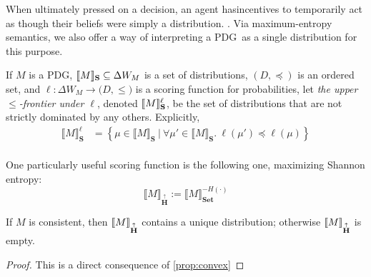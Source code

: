 \documentclass{article}
\newcommand\changed[1]{{\color{note-fg} #1}}
\newcommand\Set{\textbf{Set}}
\newcommand\MaxEnt{{\overset{\uparrow}{\mathbf H}}}
\newcommand{\MN}{PDG}
\begin{document}
	
	\changed{When ultimately pressed on a decision, an agent hasincentives to temporarily act as though their beliefs were simply a distribution. }. Via maximum-entropy semantics, we also offer a way of interpreting a \MN\ as a single distribution for this purpose. 
	
	\begin{defn}
		If  $M$ is a \MN, $\llbracket M\rrbracket_{\mathbf S} \subseteq \Delta W_{M}$ is a set of distributions, $(D, \preceq)$ is an ordered set, and $\ell : \Delta W_{M} \to \mathbb (D, \leq)$ is a scoring function for probabilities, let \emph{the upper $\leq$-frontier under $\ell$}, denoted $\llbracket M\rrbracket_{\mathbf S}^\ell$, be the set of distributions that are not strictly dominated by any others. Explicitly,
		\begin{align*}
			\llbracket M \rrbracket_{\mathbf S}^\ell &=  \left\{\mu \in \llbracket M \rrbracket_{\mathbf S} ~\Big|~ \forall \mu' \in \llbracket M \rrbracket_{\mathbf S}.~ \ell(\mu') \preceq \ell(\mu)  \right\} \\
		\end{align*}
	\end{defn}
	One particularly useful scoring function is the following one, maximizing Shannon entropy:
	\[ \Big\llbracket M \Big\rrbracket_\MaxEnt := \Big\llbracket M \Big\rrbracket_\Set^{-H(\cdot)} \]

	\begin{theorem} 
		If $M$ is consistent, then $\bbr{M}_\MaxEnt$ contains a unique distribution; otherwise $\bbr{M}_\MaxEnt$ is empty.
	\end{theorem}
	\begin{proof}
		\vspace{-1em}
		This is a direct consequence of \cref{prop:convex}
	\end{proof}
\end{document}
